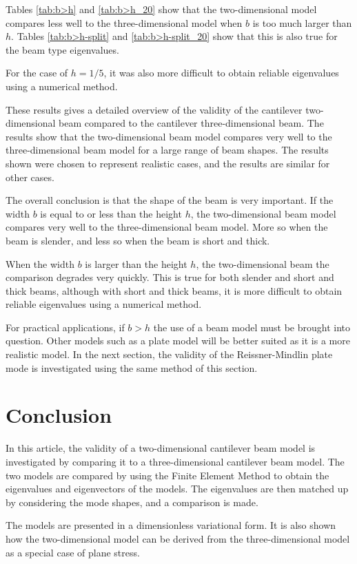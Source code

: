 Tables \ref{tab:b>h} and \ref{tab:b>h_20} show that the two-dimensional model compares less well to the three-dimensional model when $b$ is too much larger than $h$. Tables \ref{tab:b>h-split} and \ref{tab:b>h-split_20} show that this is also true for the beam type eigenvalues.

For the case of $h=1/5$, it was also more difficult to obtain reliable eigenvalues using a numerical method.

These results gives a detailed overview of the validity of the cantilever two-dimensional beam compared to the cantilever three-dimensional beam. The results show that the two-dimensional beam model compares very well to the three-dimensional beam model for a large range of beam shapes. The results shown were chosen to represent realistic cases, and the results are similar for other cases.

The overall conclusion is that the shape of the beam is very important. If the width $b$ is equal to or less than the height $h$, the two-dimensional beam model compares very well to the three-dimensional beam model. More so when the beam is slender, and less so when the beam is short and thick.

When the width $b$ is larger than the height $h$, the two-dimensional beam the comparison degrades very quickly. This is true for both slender and short and thick beams, although with short and thick beams, it is more difficult to obtain reliable eigenvalues using a numerical method.

For practical applications, if $b > h$ the use of a beam model must be brought into question. Other models such as a plate model will be better suited as it is a more realistic model. In the next section, the validity of the Reissner-Mindlin plate mode is investigated using the same method of this section.

\section{Conclusion}
In this article, the validity of a two-dimensional cantilever beam model is investigated by comparing it to a three-dimensional cantilever beam model. The two models are compared by using the Finite Element Method to obtain the eigenvalues and eigenvectors of the models. The eigenvalues are then matched up by considering the mode shapes, and a comparison is made.

The models are presented in a dimensionless variational form. It is also shown how the two-dimensional model can be derived from the three-dimensional model as a special case of plane stress.

